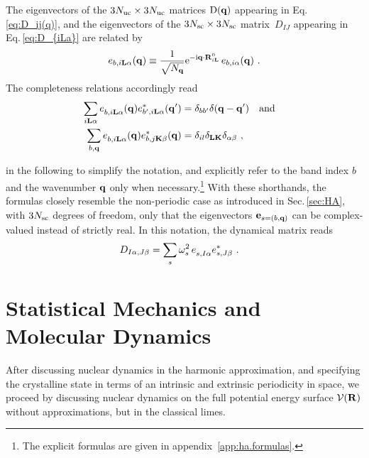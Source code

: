The eigenvectors of the $3N_{\rm uc} \times 3N_{\rm uc}$ matrices $\mathrm D ({\bf q})$ appearing in Eq.\,\eqref{eq:D_ij(q)}, and the eigenvectors of the $3N_{\rm sc} \times 3N_{\rm sc}$ matrix~$D_{IJ}$ appearing in Eq.\,\eqref{eq:D_{iLa}} are related by
\begin{align}
	e_{b, i {\bf L} \alpha} ({\bf q})
		\equiv \frac{1}{\sqrt{N_{{\bf q}}}} {\rm e}^{- {\rm i} {\bf q}  \cdot {\bf R}^0_{i {\bf L}}} \, e_{b, i \alpha} ({\bf q})~.
\end{align}
The completeness relations accordingly read
\begin{align}
	\sum_{i \b L \alpha} \fD e_{b, i \b L \alpha} (\b q) e^\ast_{b', i \b L \alpha} (\b q') 
		&= \delta_{b b'} \delta (\b q - \b q') \quad \text{and} \quad \\
	\sum_{b, \b q} \fD e_{b, i \b L \alpha} (\b q) e^\ast_{b, j \b K \beta} (\b q)
		&= \delta_{il} \delta_{\b L \b K} \delta_{\alpha \beta}~,
	\label{eq:completeness.e_bq}
\end{align}

 in the following to simplify the notation, and explicitly refer to the band index $b$ and the wavenumber ${\bf q}$ only when necessary.\footnote{The explicit formulas are given in appendix~\ref{app:ha.formulas}.}
With these shorthands, the formulas closely resemble the non-periodic case as introduced in Sec.\,\ref{sec:HA}, with $3N_{\rm sc}$ degrees of freedom, only that the eigenvectors ${\bf e}_{s = (b, {\bf q})}$ can be complex-valued instead of strictly real. In this notation, the dynamical matrix reads
\begin{align}
D_{I \alpha, J \beta}
&= \sum_s \omega^{2}_{s \vphantom I} \, \fD e_{s, I \alpha} e^\ast_{s, J \beta}~.
\end{align}


\newpage

\section{Statistical Mechanics and Molecular Dynamics}
After discussing nuclear dynamics in the harmonic approximation, and specifying the crystalline state in terms of an intrinsic and extrinsic periodicity in space, we proceed by discussing nuclear dynamics on the full potential energy surface $\mathcal{V} ({\bf R})$ without approximations, but in the classical limes.

